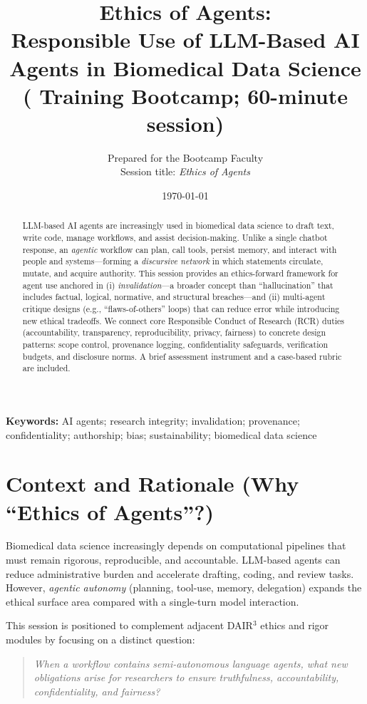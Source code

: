 \documentclass[11pt]{article}
\title{Ethics of Agents:\\Responsible Use of LLM-Based AI Agents in Biomedical Data Science\\(\DAIR{} Training Bootcamp; 60-minute session)}
\author{Prepared for the \DAIR{} Bootcamp Faculty \\
Session title: \emph{Ethics of Agents}}
\date{\today}
\newcommand{\DAIR}{DAIR$^3$}
\begin{document}
\maketitle

\begin{abstract}
LLM-based AI agents are increasingly used in biomedical data science to draft text, write code, manage workflows, and assist decision-making. Unlike a single chatbot response, an \emph{agentic} workflow can plan, call tools, persist memory, and interact with people and systems---forming a \emph{discursive network} in which statements circulate, mutate, and acquire authority. This session provides an ethics-forward framework for agent use anchored in (i) \emph{invalidation}---a broader concept than ``hallucination'' that includes factual, logical, normative, and structural breaches---and (ii) multi-agent critique designs (e.g., ``flaws-of-others'' loops) that can reduce error while introducing new ethical tradeoffs. We connect core Responsible Conduct of Research (RCR) duties (accountability, transparency, reproducibility, privacy, fairness) to concrete design patterns: scope control, provenance logging, confidentiality safeguards, verification budgets, and disclosure norms. A brief assessment instrument and a case-based rubric are included.
\end{abstract}

\textbf{Keywords:} AI agents; research integrity; invalidation; provenance; confidentiality; authorship; bias; sustainability; biomedical data science

\section{Context and Rationale (Why ``Ethics of Agents''?)}
Biomedical data science increasingly depends on computational pipelines that must remain rigorous, reproducible, and accountable. LLM-based agents can reduce administrative burden and accelerate drafting, coding, and review tasks. However, \emph{agentic autonomy} (planning, tool-use, memory, delegation) expands the ethical surface area compared with a single-turn model interaction.

This session is positioned to complement adjacent \DAIR{} ethics and rigor modules by focusing on a distinct question:
\begin{quote}
\emph{When a workflow contains semi-autonomous language agents, what new obligations arise for researchers to ensure truthfulness, accountability, confidentiality, and fairness?}
\end{quote}
\end{document}
